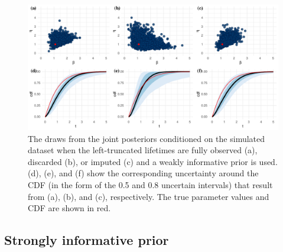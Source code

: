 \begin{figure}
    \centering
    \includegraphics[width=1\textwidth]{./figures/ch-2/joint-posts.pdf}
    \caption{The draws from the joint posteriors conditioned on the simulated dataset when the left-truncated lifetimes are fully observed (a), discarded (b), or imputed (c) and a weakly informative prior is used. (d), (e), and (f) show the corresponding uncertainty around the CDF (in the form of the 0.5 and 0.8 uncertain intervals) that result from (a), (b), and (c), respectively. The true parameter values and CDF are shown in red.}
    \label{fig:joint-post-weibull}
\end{figure}

\subsection{Strongly informative prior} \label{subsec:weibull-model-fits-informative}

